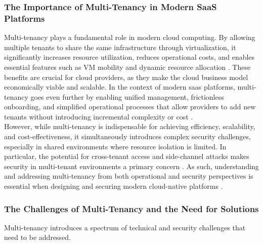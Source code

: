 \documentclass[11pt, a4paper, oneside, listof=totoc]{scrartcl}
\begin{document}
            \subsubsection{The Importance of Multi-Tenancy in Modern SaaS Platforms}\label{subsubsec:mtImportance}
                Multi-tenancy plays a fundamental role in modern cloud computing. 
                By allowing multiple tenants to share the same infrastructure through
                virtualization, it significantly increases resource utilization, reduces operational
                costs, and enables essential features such as VM mobility and dynamic resource
                allocation \parencite[pp.~345--346]{aljahdali2014}. 
                These benefits are crucial for cloud providers, as they make the cloud business
                model economically viable and scalable. 
                In the context of modern \gls{saas} platforms, multi-tenancy goes even further by
                enabling unified management, frictionless onboarding, and simplified operational
                processes that allow providers to add new tenants without introducing incremental
                complexity or cost \parencite[pp.~9--11]{awsSaaSArchitectureFundamentals}.
                \\
                However, while multi-tenancy is indispensable for achieving efficiency, scalability,
                and cost-effectiveness, it simultaneously introduces complex security challenges,
                especially in shared environments where resource isolation is limited. 
                In particular, the potential for cross-tenant access and side-channel attacks makes
                security in multi-tenant environments a primary concern
                \parencite[pp.~345--346]{aljahdali2014}. 
                As such, understanding and addressing multi-tenancy from both operational and
                security perspectives is essential when designing and securing modern cloud-native
                platforms
                \parencites[pp.~9--11]{awsSaaSArchitectureFundamentals}[p.~4]{isoConcepts}.

            \subsubsection{The Challenges of Multi-Tenancy and the Need for Solutions}\label{subsubsec:challenges}
                Multi-tenancy introduces a spectrum of technical and security challenges that need
                to be addressed.
\end{document}
